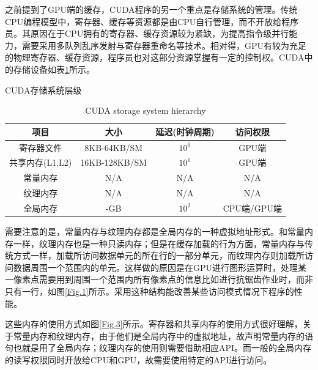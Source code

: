 \par 之前提到了GPU端的缓存，CUDA程序的另一个重点是存储系统的管理。传统CPU编程模型中，寄存器、缓存等资源都是由CPU自行管理，而不开放给程序员。其原因在于CPU拥有的寄存器、缓存资源较为紧缺，为提高指令级并行能力，需要采用多队列乱序发射与寄存器重命名等技术。相对得，GPU有较为充足的物理寄存器、缓存资源，程序员也对这部分资源掌握有一定的控制权\parencite{CUDAPROG}。CUDA中的存储设备如表\ref{table-存储}所示。
\begin{table}
	\centering
	\renewcommand{\thetable}{\arabic{section}-\arabic{table} }
	\renewcommand{\tablename}{表}
	\caption{CUDA存储系统层级}
	\addtocounter{table}{-1}
	\renewcommand{\thetable}{\arabic{section}-\arabic{table} }
	\renewcommand{\tablename}{Table}
	\caption{CUDA storage system hierarchy}
	\begin{tabular}{cccc}
		\toprule
		项目				&	大小			&	延迟(时钟周期)	&	访问权限	\\
		\midrule
		寄存器文件		&	8KB-64KB/SM		&	$ 10^0 $	& GPU端	\\
		共享内存(L1,L2)	&	16KB-128KB/SM	&	$ 10^1 $	&	GPU端\\
		常量内存		&	N/A				&	N/A		&	N/A	\\
		纹理内存		&	N/A				&	N/A		&	N/A \\
		全局内存		&	-GB				&	$ 10^2 $	&	CPU端/GPU端 \\
		\bottomrule
	\end{tabular} \label{table-存储}
\end{table}
\par 需要注意的是，常量内存与纹理内存都是全局内存的一种虚拟地址形式。和常量内存一样，纹理内存也是一种只读内存；但是在缓存加载的行为方面，常量内存与传统方式一样，加载所访问数据单元的所在行的一部分单元，而纹理内存则加载所访问数据周围一个范围内的单元\parencite{THEDESIGN}。这样做的原因是在GPU进行图形运算时，处理某一像素点需要用到周围一个范围内所有像素点的信息比如进行抗锯齿作业时，而非只有一行，如图\ref{Fig.1}所示。采用这种结构能改善某些访问模式情况下程序的性能。
\par 这些内存的使用方式如图\ref{Fig.3}所示。寄存器和共享内存的使用方式很好理解，关于常量内存和纹理内存，由于他们是全局内存中的虚拟地址，故声明常量内存的语句也就是用了全局内存；纹理内存的使用则需要借助相应API。而一般的全局内存的读写权限同时开放给CPU和GPU，故需要使用特定的API进行访问。
